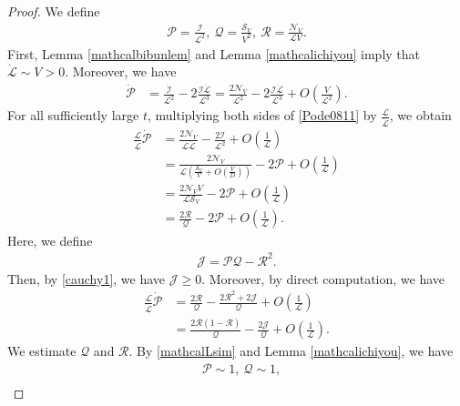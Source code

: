 \documentclass[10pt,a4paper]{amsart}
\numberwithin{equation}{section}
\begin{document}
\begin{proof}
We define
\begin{align*}
\mathcal{P}=\frac{\mathcal{I}}{\mathcal{L}^2},\ \mathcal{Q}=\frac{\mathcal{S}_V}{V^2},\ \mathcal{R}=\frac{\mathcal{N}_V}{\mathcal{L}V}.
\end{align*}
First, Lemma \ref{mathcalbibunlem} and Lemma \ref{mathcalichiyou} imply that $\dot{\mathcal L}\sim V>0$. Moreover, we have
\begin{align}\label{Pode0811}
\dot{\mathcal{P}}&=\frac{\dot{\mathcal{I}}}{\mathcal{L}^2}-2\frac{\mathcal{I}\dot{\mathcal{L}}}{\mathcal{L}^3}=\frac{2\mathcal{N}_V}{\mathcal{L}^2}-2\frac{\mathcal{I}\dot{\mathcal{L}}}{\mathcal{L}^3}+O\left(\frac{V}{\mathcal{L}^2}\right).
\end{align}
For all sufficiently large $t$, multiplying both sides of \eqref{Pode0811} by $\frac{\mathcal{L}}{\dot{\mathcal{L}}}$, we obtain
\begin{align*}
\frac{\mathcal{L}}{\dot{\mathcal{L}}}\dot{\mathcal{P}}&=\frac{2\mathcal{N}_V}{\mathcal{L}\dot{\mathcal{L}}}-\frac{2\mathcal{I}}{\mathcal{L}^2}+O\left(\frac{1}{\mathcal{L}}\right)
\\
&=\frac{2\mathcal{N}_V}{\mathcal{L}\left(\frac{\mathcal{S}_V}{V}+O\left(\frac{V}{D}\right)\right)}-2\mathcal{P}+O\left(\frac{1}{\mathcal{L}}\right)
\\
&=\frac{2\mathcal{N}_VV}{\mathcal{L}\mathcal{S}_V}-2\mathcal{P}+O\left(\frac{1}{\mathcal{L}}\right)
\\
&=\frac{2\mathcal{R}}{\mathcal{Q}}-2\mathcal{P}+O\left(\frac{1}{\mathcal{L}}\right).
\end{align*}
Here, we define
\begin{align*}
\mathcal{J}=\mathcal{P}\mathcal{Q}-\mathcal{R}^2.
\end{align*}
Then, by \eqref{cauchy1}, we have $\mathcal{J}\geq 0$. Moreover, by direct computation, we have
\begin{align*}
\frac{\mathcal{L}}{\dot{\mathcal{L}}}\dot{\mathcal{P}}&=\frac{2\mathcal{R}}{\mathcal{Q}}-\frac{2\mathcal{R}^2+2\mathcal{J}}{\mathcal{Q}}+O\left(\frac{1}{\mathcal{L}}\right)
\\
&=\frac{2\mathcal{R}(1-\mathcal{R})}{\mathcal{Q}}-\frac{2\mathcal{J}}{\mathcal{Q}}+O\left(\frac{1}{\mathcal{L}}\right).
\end{align*}
We estimate $\mathcal{Q}$ and $\mathcal{R}$. By \eqref{mathcalLsim} and Lemma \ref{mathcalichiyou}, we have
\begin{align*}
&\mathcal{P}\sim 1,\ \mathcal{Q}\sim 1,
\\

\end{align*}
\end{proof}
\end{document}
